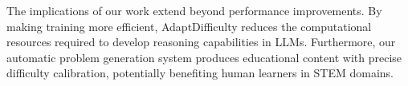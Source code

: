 The implications of our work extend beyond performance improvements. By making training more efficient, AdaptDifficulty reduces the computational resources required to develop reasoning capabilities in LLMs. Furthermore, our automatic problem generation system produces educational content with precise difficulty calibration, potentially benefiting human learners in STEM domains.




